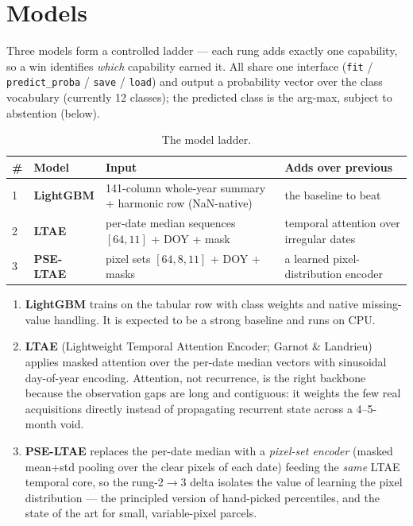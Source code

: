 \documentclass[11pt,a4paper]{article}
\begin{document}
\section{Models}
\label{sec:models}

Three models form a controlled ladder --- each rung adds exactly one capability, so a win
identifies \emph{which} capability earned it. All share one interface
(\texttt{fit} / \texttt{predict\_proba} / \texttt{save} / \texttt{load}) and output a
probability vector over the class vocabulary (currently 12 classes); the predicted class is
the arg-max, subject to
abstention (below).

\begin{table}[ht]
\centering\small
\caption{The model ladder.}
\begin{tabular}{@{}llp{4.5cm}p{4.5cm}@{}}
\toprule
\# & Model & Input & Adds over previous \\
\midrule
1 & \textbf{LightGBM} & 141-column whole-year summary + harmonic row (NaN-native) & the
baseline to beat \\
2 & \textbf{LTAE} & per-date median sequences $[64,11]$ + DOY + mask & temporal attention over
irregular dates \\
3 & \textbf{PSE-LTAE} & pixel sets $[64,8,11]$ + DOY + masks & a learned pixel-distribution
encoder \\
\bottomrule
\end{tabular}
\end{table}

\begin{enumerate}[leftmargin=1.5em]
\item \textbf{LightGBM} trains on the tabular row with class weights and native missing-value
handling. It is expected to be a strong baseline and runs on CPU.
\item \textbf{LTAE} (Lightweight Temporal Attention Encoder; Garnot \& Landrieu) applies masked
attention over the per-date median vectors with sinusoidal day-of-year encoding. Attention, not
recurrence, is the right backbone because the observation gaps are long and contiguous: it
weights the few real acquisitions directly instead of propagating recurrent state across a
4--5-month void.
\item \textbf{PSE-LTAE} replaces the per-date median with a \emph{pixel-set encoder} (masked
mean+std pooling over the clear pixels of each date) feeding the \emph{same} LTAE temporal
core, so the rung-2$\to$3 delta isolates the value of learning the pixel distribution --- the
principled version of hand-picked percentiles, and the state of the art for small,
variable-pixel parcels.
\end{enumerate}
\end{document}

